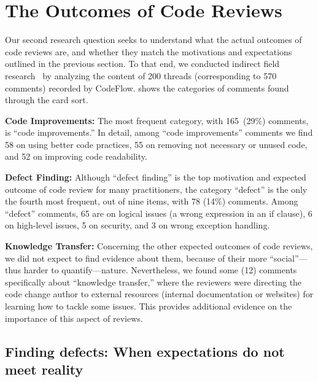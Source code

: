 
\section{The Outcomes of Code Reviews} \label{sec:outcomes}


Our second research question seeks to understand what the actual outcomes of code reviews are, and whether they match the motivations and expectations outlined in the previous section. To that end, we conducted indirect field research~\cite{lethbridge2005studying} by analyzing the content of 200 threads (corresponding to 570 comments) recorded by CodeFlow.  shows the categories of comments found through the card sort.

\textbf{Code Improvements:} The most frequent category, with 165~(29\%) comments, is ``code improvements.'' In detail, among ``code improvements'' comments we find 58 on using better code practices, 55 on removing not necessary or unused code, and 52 on improving code readability.

\textbf{Defect Finding:} Although ``defect finding'' is the top motivation and expected outcome of code review for many practitioners, the category ``defect'' is the only the fourth most frequent, out of nine items, with 78 (14\%) comments. Among ``defect'' comments, 65 are on logical issues (\eg a wrong expression in an if clause), 6 on high-level issues, 5 on security, and 3 on wrong exception handling.

\textbf{Knowledge Transfer:} Concerning the other expected outcomes of code reviews, we did not expect to find evidence about them, because of their more ``social''—thus harder to quantify—nature. Nevertheless, we found some (12) comments specifically about ``knowledge transfer,'' where the reviewers were directing the code change author to external resources (\eg internal documentation or websites) for learning how to tackle some issues. This provides additional evidence on the importance of this aspect of reviews.

\subsection{Finding defects: When expectations do not meet reality}

